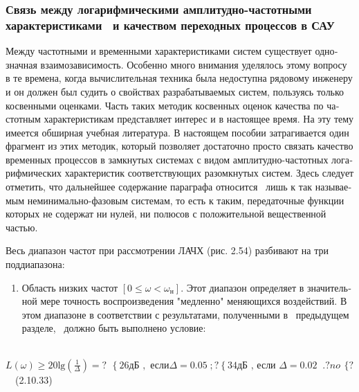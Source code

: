 \documentclass[a4paper]{article}
\newcommand\liststyleWWviiiNumlxx{%
\renewcommand\theenumi{\arabic{enumi}}
\renewcommand\theenumii{\arabic{enumii}}
\renewcommand\theenumiii{\arabic{enumiii}}
\renewcommand\theenumiv{\arabic{enumiv}}
\renewcommand\labelenumi{\theenumi).}
\renewcommand\labelenumii{\theenumii.}
\renewcommand\labelenumiii{\theenumiii.}
\renewcommand\labelenumiv{\theenumiv.}
}
\begin{document}
\subsubsection[Связь между логарифмическими амплитудно-частотными характеристиками \ и качеством переходных процессов в
САУ]{Связь между логарифмическими амплитудно-частотными характеристиками \ и качеством переходных процессов в САУ}
\hypertarget{RefHeadingToc455659727}{}{\begin{russian}\sffamily
Между частотными и временными характеристиками систем существует однозначная взаимозависимость. Особенно много внимания
уделялось этому вопросу в те времена, когда вычислительная техника была недоступна рядовому инженеру и он должен был
судить о свойствах разрабатываемых систем, пользуясь только косвенными оценками. Часть таких методик косвенных оценок
качества по частотным характеристикам представляет интерес и в настоящее время. На эту тему имеется обширная учебная
литература. В настоящем пособии затрагивается один фрагмент из этих методик, который позволяет достаточно просто
связать качество временных процессов в замкнутых системах с видом амплитудно-частотных логарифмических характеристик
соответствующих разомкнутых систем. Здесь следует отметить, что дальнейшее содержание параграфа относится \ лишь к так
называемым неминимально-фазовым системам, то есть к таким, передаточные функции которых не содержат ни нулей, ни
полюсов с положительной вещественной частью.
\end{russian}}

{\begin{russian}\sffamily
Весь диапазон частот при рассмотрении ЛАЧХ (рис. 2.54) разбивают на три поддиапазона:
\end{russian}}


\bigskip

\liststyleWWviiiNumlxx
\begin{enumerate}
\item {\begin{russian}\sffamily
Область низких частот  $\left[0\le ω<ω_н\right]$. Этот диапазон определяет в значительной мере точность воспроизведения
"медленно" меняющихся воздействий. В этом диапазоне в соответствии с результатами, полученными в \ предыдущем разделе,
\ должно быть выполнено условие:
\end{russian}}
\end{enumerate}
{\begin{russian}\sffamily
\ \  $L(ω)\ge 20\text{lg}\left(\frac 1 Δ\right)=?\begin{matrix}\left\{26\text{дБ  },\text{  если
}Δ=0.05\;;?\right.\left\{\text{34дБ  ,  если }Δ=0.02\;\;.?\right.\mathit{no}\end{matrix}\{?$\ \ (2.10.33)
\end{russian}}
\end{document}
